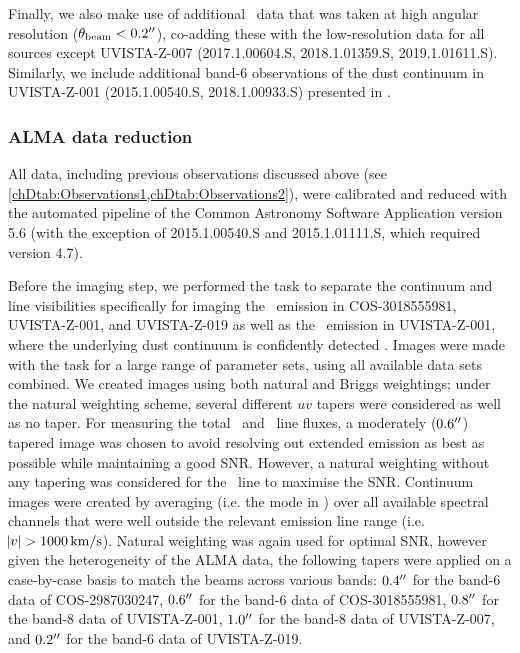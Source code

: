 Finally, we also make use of additional \CII\ data that was taken at high angular resolution ($\theta_\text{beam} < 0.2 \hbox{$^{\prime\prime}$}$), co-adding these with the low-resolution data for all sources except UVISTA-Z-007 (2017.1.00604.S, 2018.1.01359.S, 2019.1.01611.S). Similarly, we include additional band-6 observations of the dust continuum in UVISTA-Z-001 (2015.1.00540.S, 2018.1.00933.S) presented in \citet{2018MNRAS.481.1631B, 2022MNRAS.510.5088B}.

\subsubsection{ALMA data reduction}
\label{chDsssec:Observations:ALMA_data_reduction}

All data, including previous observations discussed above (see \cref{chDtab:Observations1,chDtab:Observations2}), were calibrated and reduced with the automated pipeline of the Common Astronomy Software Application \citep[;][]{2007ASPC..376..127M} version 5.6 (with the exception of 2015.1.00540.S and 2015.1.01111.S, which required version 4.7).

Before the imaging step, we performed the  task to separate the continuum and line visibilities specifically for imaging the \CII\ emission in COS-3018555981, UVISTA-Z-001, and UVISTA-Z-019 as well as the \OIIIf\ emission in UVISTA-Z-001, where the underlying dust continuum is confidently detected \citep[\cref{chDssec:Results:Dust_continuum}; see also][]{2022ApJ...928...31S}. Images were made with the  task for a large range of parameter sets, using all available data sets combined. We created images using both natural and Briggs weightings; under the natural weighting scheme, several different $uv$ tapers were considered as well as no taper. For measuring the total \OIIIf\ and \CII\ line fluxes, a moderately ($0.6 \hbox{$^{\prime\prime}$}$) tapered image was chosen to avoid resolving out extended emission \citep[see e.g.][]{2018MNRAS.478.1170C, 2020MNRAS.499.5136C} as best as possible while maintaining a good SNR. However, a natural weighting without any tapering was considered for the \NII\ line to maximise the SNR. Continuum images were created by averaging (i.e. the  mode in ) over all available spectral channels that were well outside the relevant emission line range (i.e. $\abs{v} > \num{1000} \, \mathrm{km/s}$). Natural weighting was again used for optimal SNR, however given the heterogeneity of the ALMA data, the following tapers were applied on a case-by-case basis to match the beams across various bands: $0.4 \hbox{$^{\prime\prime}$}$ for the band-6 data of COS-2987030247, $0.6 \hbox{$^{\prime\prime}$}$ for the band-6 data of COS-3018555981, $0.8 \hbox{$^{\prime\prime}$}$ for the band-8 data of UVISTA-Z-001, $1.0 \hbox{$^{\prime\prime}$}$ for the band-8 data of UVISTA-Z-007, and $0.2 \hbox{$^{\prime\prime}$}$ for the band-6 data of UVISTA-Z-019.

